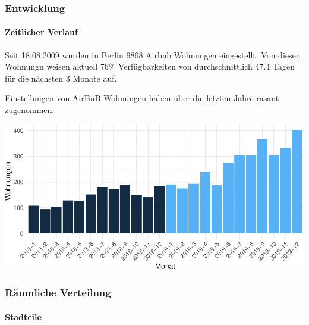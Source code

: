 \documentclass[
]{article}
\author{}
\date{\vspace{-2.5em}}
\begin{document}
\hypertarget{entwicklung}{%
\subsubsection{Entwicklung}\label{entwicklung}}

\hypertarget{zeitlicher-verlauf}{%
\paragraph{Zeitlicher Verlauf}\label{zeitlicher-verlauf}}

Seit 18.08.2009 wurden in Berlin 9868 Airbnb Wohnungen eingestellt. Von
diesen Wohnungn weisen aktuell 76\% Verfügbarkeiten von durchschnittlich
47.4 Tagen für die nächsten 3 Monate auf.

Einstellungen von AirBnB Wohnungen haben über die letzten Jahre rasant
zugenommen.

\includegraphics{case_files/figure-latex/unnamed-chunk-1-1.pdf}

\hypertarget{ruxe4umliche-verteilung}{%
\subsubsection{Räumliche Verteilung}\label{ruxe4umliche-verteilung}}

\hypertarget{stadteile}{%
\paragraph{Stadteile}\label{stadteile}}
\end{document}

